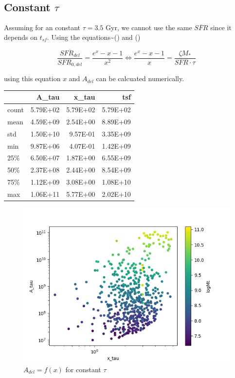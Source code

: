 \documentclass[a4paper,twocolumn]{article}
\begin{document}
\subsection{Constant \(\tau\)}
\label{sec:org4942cfd}

Assuming for an constant \(\tau=3.5\) Gyr, we cannot use the same \(\overline{SFR}\) since it depends on \(t_{sf}\). Using the equations\textasciitilde{}() and ()

$$
    \frac{\overline{SFR_{del}}}{SFR_{0,del}}=\frac{e^x-x-1}{x^2}\Leftrightarrow \frac{e^x-x-1}{x}=\frac{\zeta M_*}{SFR\cdot\tau}
$$

using this equation \(x\) and \(A_{del}\) can be calcuated numerically.

\begin{table}[hc]
\centering
\begin{tabular}{lrrr}
\toprule
{} &    A\_tau &    x\_tau &      tsf \\
\midrule
count & 5.79E+02 & 5.79E+02 & 5.79E+02 \\
mean  & 4.59E+09 & 2.54E+00 & 8.89E+09 \\
std   & 1.50E+10 & 9.57E-01 & 3.35E+09 \\
min   & 9.87E+06 & 4.07E-01 & 1.42E+09 \\
25\%   & 6.50E+07 & 1.87E+00 & 6.55E+09 \\
50\%   & 2.37E+08 & 2.44E+00 & 8.54E+09 \\
75\%   & 1.12E+09 & 3.08E+00 & 1.08E+10 \\
max   & 1.06E+11 & 5.77E+00 & 2.02E+10 \\
\bottomrule
\end{tabular}
\end{table}

\begin{figure}[htbp]
\centering
\includegraphics[width=.9\linewidth]{./figs/x-A_tau.png}
\caption{\label{fig:$A_{del} = f(x)$ for constant $\tau$}\(A_{del} = f(x)\) for constant \(\tau\)}
\end{figure}
\end{document}
